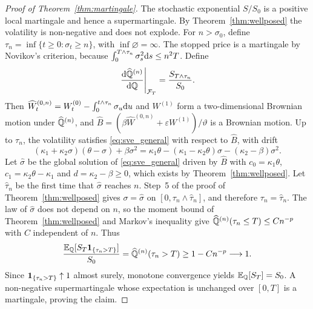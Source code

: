 \begin{proof}[Proof of Theorem~\ref{thm:martingale}]
The stochastic exponential $S/S_0$ is a positive local martingale and hence a supermartingale. By Theorem~\ref{thm:wellposed} the volatility is non-negative and does not explode. For $n>\sigma_0$, define $\tau_n=\inf\{t\ge0:\sigma_t\ge n\}$, with $\inf\varnothing=\infty$. The stopped price is a martingale by Novikov's criterion, because $\int_0^{T\wedge\tau_n}\sigma_s^2\mathrm{d} s\le n^2T$. Define
\begin{equation*}
\left.\frac{\mathrm{d}\widehat{\mathbb{Q}}^{(n)}}{\mathrm{d}\mathbb{Q}}\right|_{\mathcal{F}_T}=\frac{S_{T\wedge\tau_n}}{S_0}.
\end{equation*}
Then $\widehat W^{(0,n)}_t=W^{(0)}_t-\int_0^{t\wedge\tau_n}\sigma_u\mathrm{d} u$ and $W^{(1)}$ form a two-dimensional Brownian motion under $\widehat{\mathbb{Q}}^{(n)}$, and $\widehat B=(\beta\widehat W^{(0,n)}+\varepsilon W^{(1)})/\vartheta$ is a Brownian motion. Up to $\tau_n$, the volatility satisfies \eqref{eq:sve_general} with respect to $\widehat B$, with drift
\begin{equation*}
(\kappa_1+\kappa_2\sigma)(\theta-\sigma)+\beta\sigma^2
=\kappa_1\theta-(\kappa_1-\kappa_2\theta)\sigma-(\kappa_2-\beta)\sigma^2.
\end{equation*}
Let $\widehat\sigma$ be the global solution of \eqref{eq:sve_general} driven by $\widehat B$ with $c_0=\kappa_1\theta$, $c_1=\kappa_2\theta-\kappa_1$ and $d=\kappa_2-\beta\ge0$, which exists by Theorem~\ref{thm:wellposed}. Let $\widehat\tau_n$ be the first time that $\widehat\sigma$ reaches $n$. Step~5 of the proof of Theorem~\ref{thm:wellposed} gives $\sigma=\widehat\sigma$ on $[0,\tau_n\wedge\widehat\tau_n]$, and therefore $\tau_n=\widehat\tau_n$. The law of $\widehat\sigma$ does not depend on $n$, so the moment bound of Theorem~\ref{thm:wellposed} and Markov's inequality give $\widehat{\mathbb{Q}}^{(n)}(\tau_n\le T)\le Cn^{-p}$ with $C$ independent of $n$. Thus
\begin{equation*}
\frac{\mathbb{E}_{\mathbb{Q}}[S_T\mathbf{1}_{\{\tau_n>T\}}]}{S_0}
=\widehat{\mathbb{Q}}^{(n)}(\tau_n>T)
\ge1-Cn^{-p}\longrightarrow1.
\end{equation*}
Since $\mathbf{1}_{\{\tau_n>T\}}\uparrow1$ almost surely, monotone convergence yields $\mathbb{E}_{\mathbb{Q}}[S_T]=S_0$. A non-negative supermartingale whose expectation is unchanged over $[0,T]$ is a martingale, proving the claim.
\end{proof}

